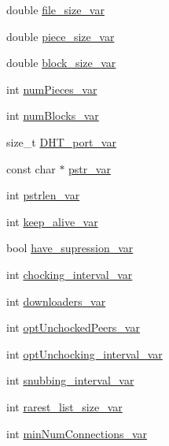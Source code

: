 \begin{DoxyCompactItemize}
\item 
double \hyperlink{classBTPeerWireBase_af5f801d2246936ff734d46da2c636808}{file\+\_\+size\+\_\+var}
\item 
double \hyperlink{classBTPeerWireBase_a991184da11bea370518375ed22d40851}{piece\+\_\+size\+\_\+var}
\item 
double \hyperlink{classBTPeerWireBase_ab42c0dee2bf5f0c4367dda80479e1cd4}{block\+\_\+size\+\_\+var}
\item 
int \hyperlink{classBTPeerWireBase_ac39f13c6abf79c49378ee6a2e2969b38}{num\+Pieces\+\_\+var}
\item 
int \hyperlink{classBTPeerWireBase_a9e23c447331f54f304a1a80780f4c822}{num\+Blocks\+\_\+var}
\item 
size\+\_\+t \hyperlink{classBTPeerWireBase_aaf7c8a682c94dc9722f7bb0820de3c4b}{D\+H\+T\+\_\+port\+\_\+var}
\item 
const char $\ast$ \hyperlink{classBTPeerWireBase_a5438f411c39373ffe971d6de0c58816e}{pstr\+\_\+var}
\item 
int \hyperlink{classBTPeerWireBase_a64c379ccef5c078ae8d9ece6849d8647}{pstrlen\+\_\+var}
\item 
int \hyperlink{classBTPeerWireBase_a792fc76ee2289e77d94944da9c1c5d66}{keep\+\_\+alive\+\_\+var}
\item 
bool \hyperlink{classBTPeerWireBase_a0eed3e65be2cde5f4a95b75723dd8f7e}{have\+\_\+supression\+\_\+var}
\item 
int \hyperlink{classBTPeerWireBase_a1a8252e85b38f85bb3eee0b42a31b2a4}{chocking\+\_\+interval\+\_\+var}
\item 
int \hyperlink{classBTPeerWireBase_aa616c5456eb2e3b264392c2b9c115ea8}{downloaders\+\_\+var}
\item 
int \hyperlink{classBTPeerWireBase_a174271fb81f37a9a66906bc215f15517}{opt\+Unchocked\+Peers\+\_\+var}
\item 
int \hyperlink{classBTPeerWireBase_a79a89401f798432ad87174b8d58345b0}{opt\+Unchocking\+\_\+interval\+\_\+var}
\item 
int \hyperlink{classBTPeerWireBase_a14ded2e1d21de7380d6d90099093b981}{snubbing\+\_\+interval\+\_\+var}
\item 
int \hyperlink{classBTPeerWireBase_a6e818940d81beb683b6bd4ce75fc5c63}{rarest\+\_\+list\+\_\+size\+\_\+var}
\item 
int \hyperlink{classBTPeerWireBase_a64714d821af01e62d7156332d8681908}{min\+Num\+Connections\+\_\+var}
\item 

\end{DoxyCompactItemize}
